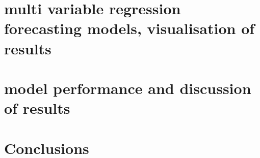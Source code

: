 \documentclass[a4paper,12pt,reqno]{report}
\begin{document}
\section{multi variable regression forecasting models, visualisation of results}
\label{sec:multi variable regression forecasting models, visualisation of results}
\section{model performance and discussion of results}
\label{sec:model performance and discussion of results}


\section{Conclusions}
    
\newpage


\end{document}
